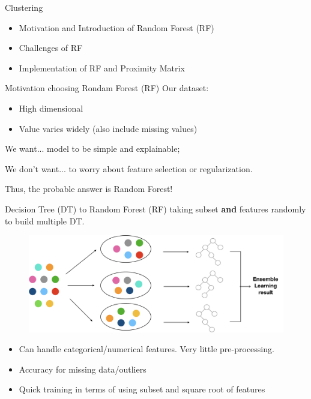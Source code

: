 \documentclass[shortpres]{beamer}
\begin{document}
\begin{frame}{Clustering}	
\begin{itemize} 
\item Motivation and Introduction of Random Forest (RF)
\vfill\item Challenges of RF
\vfill\item Implementation of RF and Proximity Matrix
\end{itemize}
\end{frame}
\begin{frame}{Motivation choosing Rondam Forest (RF)}	
  Our dataset:
  \begin{itemize} 
    \item High dimensional
    \item Value varies widely (also include missing values)
 \end{itemize}
  \begin{block}{We want...}
    model to be simple and explainable;
    \end{block}
    \begin{block}{We don't want...}
    to worry about feature selection or regularization.
      \end{block}
   Thus, the probable answer is Random Forest!
  
\end{frame}
\begin{frame}{Decision Tree (DT) to Random Forest (RF)}	
  taking subset \textbf{and} features randomly to build multiple DT.\\
  \begin{figure}
    \includegraphics[height=0.5\textheight]{fig/bagging.png} 
  \end{figure}
\begin{itemize} 
  \item Can handle categorical/numerical features. Very little pre-processing. 
  \item Accuracy for missing data/outliers
  \item Quick training in terms of using subset and square root of features
\end{itemize}

\end{frame}
\end{document}
